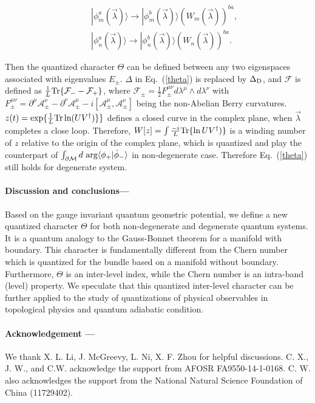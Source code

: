 \documentclass[aps,pra,twocolumn,groupedaddress,10pt]{revtex4}
\def\bea{\begin{eqnarray}} \def\eea{\end{eqnarray}}
\begin{document}
\bea  \label{gt}
&&|\phi_{m}^{a}(\vec{\lambda})\rangle \rightarrow|\phi_{m}^{b}(\vec{\lambda})\rangle (W_{m}(\vec{\lambda}))^{ba},
	\nonumber \\
&&|\phi_{n}^{a}(\vec{\lambda})\rangle \rightarrow |\phi_{n}^{b}(\vec{\lambda})\rangle (W_{n}(\vec{\lambda}))^{ba}.
\eea

Then the quantized character $\Theta$ can be defined between any
two eigenspaces associated with eigenvalues $E_\pm$.
$\Delta$ in Eq.~(\ref{theta}) is replaced by $\Delta_{\rm{D}}$, and
$\mathcal{F}$ is defined as $ \frac{1}{L}  {\rm{Tr}}\{\mathcal{F}_- -\mathcal{F}_+ \}$,
where $\mathcal{F}_{\pm} = \frac{1}{2}F_{\pm}^{\mu\nu} d\lambda^{\mu}\wedge d\lambda^{\nu}$
with $F^{\mu\nu}_{\pm} = \partial^\mu
\mathcal{A}^{\nu}_{\pm} - \partial^\nu \mathcal{A}^{\mu}_{\pm} - i \left[\mathcal{A}^\mu_{\pm}, \mathcal{A}^\nu_{\pm} \right]$
being the non-Abelian Berry curvatures.
$z(t) = \exp \{\frac{1}{L}{\rm Tr} \ln (UV^{\dag})\}\}$
defines a closed curve
in the complex plane, when $\vec{\lambda}$ completes a close loop.
Therefore, $W[z] = \int\frac{-i}{L} {\rm Tr} \{\ln UV^{\dag})\}$
is a winding number of $z$ relative to the origin of the complex plane, which
is quantized and play the counterpart of $\int_{\partial \mathcal{M}}d ~{\rm{arg}}
\langle\phi_+|\dot{\phi}_-\rangle$ in non-degenerate case.
Therefore Eq.~(\ref{theta}) still holds for degenerate system.


\paragraph*{Discussion and conclusions---}
Based on the gauge invariant quantum geometric potential, we
define a new quantized character $\Theta$ for both
non-degenerate and degenerate quantum systems.
It is a quantum analogy to the Gauss-Bonnet theorem for a manifold
with boundary.
This character is fundamentally different from the Chern number
which is quantized for the bundle based on a manifold without
boundary.
Furthermore, $\Theta$ is an inter-level index, while the Chern
number is an intra-band (level) property.
We speculate that this quantized inter-level character can be
further applied to the study of quantizations of physical
observables in topological physics and quantum adiabatic condition.


\paragraph*{Acknowledgement --- }
We thank X. L. Li, J. McGreevy, L. Ni, X. F. Zhou for helpful discussions.
C. X., J. W., and C.W. acknowledge the support from AFOSR FA9550-14-1-0168.
C. W. also acknowledges the support from the National
Natural Science Foundation of China (11729402).
\end{document}
